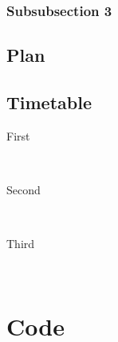 \documentclass[12pt]{article} %
\theoremstyle{plain}
\theoremstyle{definition}
\theoremstyle{remark}
\begin{document}

\subsubsection{Subsubsection 3} %

\subsection{Plan}

\subsection{Timetable}

\begin{description} %

\item[First] \hfill \\
\lipsum[9] %

\item[Second] \hfill \\
\lipsum[10] %

\item[Third] \hfill \\
\lipsum[11] %

\end{description} 






\appendix

\section{Code}


\printindex

\end{document}
